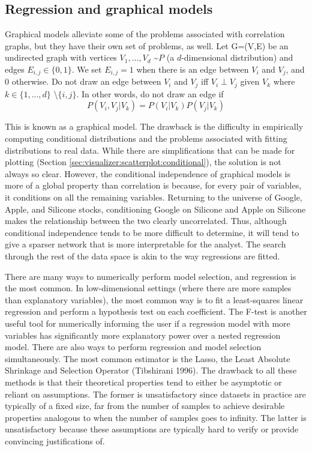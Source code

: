 \subsection{Regression and graphical models}

Graphical models alleviate some of the problems associated with correlation graphs, but they have their own set of problems, as well. Let G=(V,E) be an undirected graph with vertices $V_1,...,V_d$ \textasciitilde $P$ (a $d$-dimensional distribution) and edges $E_{i,j}\in\{0,1\}$. We set $E_{i,j}=1$ when there is an edge between $V_i$ and $V_j$, and 0 otherwise. Do not draw an edge between $V_i$ and $V_j$ iff $V_i \perp V_j$ given $V_k$ where $k\in\{1,...,d\}$ \textbackslash $\{i,j\}$. In other words, do not draw an edge if
$$P(V_i,V_j|V_k)=P(V_i|V_k)P(V_j|V_k)$$

This is known as a graphical model. The drawback is the difficulty in empirically computing conditional distributions and the problems associated with fitting distributions to real data. While there are simplifications that can be made for plotting (Section \ref{sec:visualizer:scatterplot:conditional}), the solution is not always so clear. However, the conditional independence of graphical models is more of a global property than correlation is because, for every pair of variables, it conditions on all the remaining variables. Returning to the universe of Google, Apple, and Silicone stocks, conditioning Google on Silicone and Apple on Silicone makes the relationship between the two clearly uncorrelated. Thus, although conditional independence tends to be more difficult to determine, it will tend to give a sparser network that is more interpretable for the analyst. The search through the rest of the data space is akin to the way regressions are fitted.

There are many ways to numerically perform model selection, and regression is the most common. In low-dimensional settings (where there are more samples than explanatory variables), the most common way is to fit a least-squares linear regression and perform a hypothesis test on each coefficient. The F-test is another useful tool for numerically informing the user if a regression model with more variables has significantly more explanatory power over a nested regression model. There are also ways to perform regression and model selection simultaneously. The most common estimator is the Lasso, the Least Absolute Shrinkage and Selection Operator (Tibshirani 1996). The drawback to all these methods is that their theoretical properties tend to either be asymptotic or reliant on assumptions. The former is unsatisfactory since datasets in practice are typically of a fixed size, far from the number of samples to achieve desirable properties analogous to when the number of samples goes to infinity. The latter is unsatisfactory because these assumptions are typically hard to verify or provide convincing justifications of.

